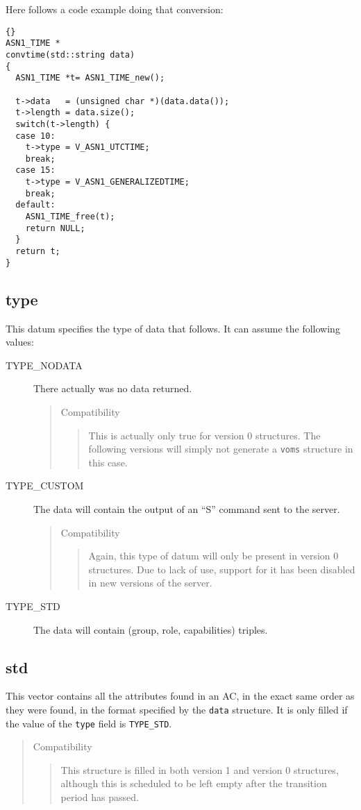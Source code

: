\documentclass[a4paper]{book}
\newenvironment{compatibility}{\begin{quote}\color{red}Compatibility\begin{quote}}{\end{quote}\color{black}\end{quote}}
\begin{document}
Here follows a code example doing that conversion:\bigskip\bigskip
\begin{lstlisting}{}
ASN1_TIME *
convtime(std::string data)
{
  ASN1_TIME *t= ASN1_TIME_new();

  t->data   = (unsigned char *)(data.data());
  t->length = data.size();
  switch(t->length) {
  case 10:
    t->type = V_ASN1_UTCTIME;
    break;
  case 15:
    t->type = V_ASN1_GENERALIZEDTIME;
    break;
  default:
    ASN1_TIME_free(t);
    return NULL;
  }
  return t;
}
\end{lstlisting}

\subsection{type}
This datum specifies the type of data that follows.  It can assume the
following values:
\begin{description}
\item [TYPE\_NODATA] There actually was no data returned.
\begin{compatibility}
This is actually only true for version 0 structures. The following
versions will simply not generate a \texttt{voms} structure in this
case.
\end{compatibility}
\item [TYPE\_CUSTOM] The data will contain the output of an ``S''
  command sent to the server.
\begin{compatibility}
Again, this type of datum will only be present in version 0
structures.  Due to lack of use, support for it has been disabled in
new versions of the server.
\end{compatibility}
\item [TYPE\_STD] The data will contain (group, role, capabilities)
  triples.
\end{description}

\subsection{std}
This vector contains all the attributes found in an AC, in the exact
same order as they were found, in the format specified by the
\texttt{data} structure.  It is only filled if the value of the
\texttt{type} field is \texttt{TYPE\_STD}.
\begin{compatibility}
This structure is filled in both version 1 and version 0 structures,
although this is scheduled to be left empty after the transition
period has passed.
\end{compatibility}
\end{document}
